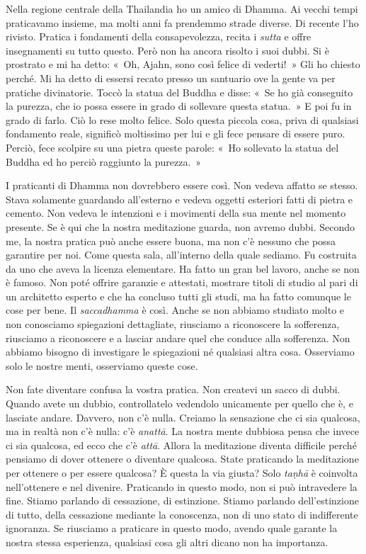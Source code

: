 Nella regione centrale della Thailandia ho un amico di Dhamma. Ai vecchi
tempi praticavamo insieme, ma molti anni fa prendemmo strade diverse. Di
recente l'ho rivisto. Pratica i fondamenti della consapevolezza, recita
i \emph{sutta} e offre insegnamenti su tutto questo. Però non ha ancora
risolto i suoi dubbi. Si è prostrato e mi ha detto: «~Oh, Ajahn, sono
così felice di vederti!~» Gli ho chiesto perché. Mi ha detto di essersi
recato presso un santuario ove la gente va per pratiche divinatorie.
Toccò la statua del Buddha e disse: «~Se ho già conseguito la purezza,
che io possa essere in grado di sollevare questa statua.~» E poi fu in
grado di farlo. Ciò lo rese molto felice. Solo questa piccola cosa,
priva di qualsiasi fondamento reale, significò moltissimo per lui e gli
fece pensare di essere puro. Perciò, fece scolpire su una pietra queste
parole: «~Ho sollevato la statua del Buddha ed ho perciò raggiunto la
purezza.~»

I praticanti di Dhamma non dovrebbero essere così. Non vedeva affatto se
stesso. Stava solamente guardando all'esterno e vedeva oggetti esteriori
fatti di pietra e cemento. Non vedeva le intenzioni e i movimenti della
sua mente nel momento presente. Se è qui che la nostra meditazione
guarda, non avremo dubbi. Secondo me, la nostra pratica può anche essere
buona, ma non c'è nessuno che possa garantire per noi. Come questa sala,
all'interno della quale sediamo. Fu costruita da uno che aveva la
licenza elementare. Ha fatto un gran bel lavoro, anche se non è famoso.
Non poté offrire garanzie e attestati, mostrare titoli di studio al pari
di un architetto esperto e che ha concluso tutti gli studi, ma ha fatto
comunque le cose per bene. Il \emph{saccadhamma} è così. Anche se non
abbiamo studiato molto e non conosciamo spiegazioni dettagliate,
riusciamo a riconoscere la sofferenza, riusciamo a riconoscere e a
lasciar andare quel che conduce alla sofferenza. Non abbiamo bisogno di
investigare le spiegazioni né qualsiasi altra cosa. Osserviamo solo le
nostre menti, osserviamo queste cose.

Non fate diventare confusa la vostra pratica. Non createvi un sacco di
dubbi. Quando avete un dubbio, controllatelo vedendolo unicamente per
quello che è, e lasciate andare. Davvero, non c'è nulla. Creiamo la
sensazione che ci sia qualcosa, ma in realtà non c'è nulla: c'è
\emph{anattā}. La nostra mente dubbiosa pensa che invece ci sia
qualcosa, ed ecco che c'è \emph{attā}. Allora la meditazione diventa
difficile perché pensiamo di dover ottenere o diventare qualcosa. State
praticando la meditazione per ottenere o per essere qualcosa? È questa
la via giusta? Solo \emph{taṇhā} è coinvolta nell'ottenere e nel
divenire. Praticando in questo modo, non si può intravedere la fine.
Stiamo parlando di cessazione, di estinzione. Stiamo parlando
dell'estinzione di tutto, della cessazione mediante la conoscenza, non
di uno stato di indifferente ignoranza. Se riusciamo a praticare in
questo modo, avendo quale garante la nostra stessa esperienza, qualsiasi
cosa gli altri dicano non ha importanza.

